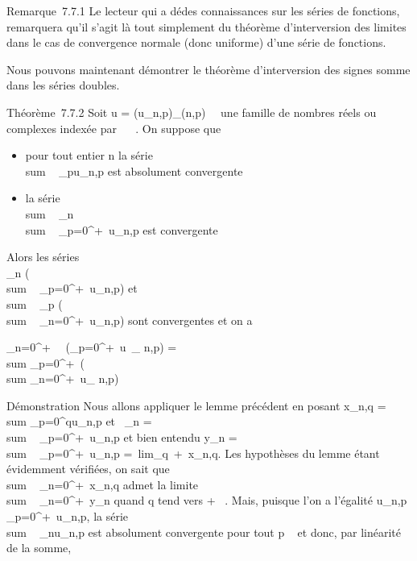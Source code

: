 \documentclass[]{article}
\begin{document}
Remarque~7.7.1 Le lecteur qui a dé des connaissances sur les séries de
fonctions, remarquera qu'il s'agit là tout simplement du théorème
d'interversion des limites dans le cas de convergence normale (donc
uniforme) d'une série de fonctions.

Nous pouvons maintenant démontrer le théorème d'interversion des signes
somme dans les séries doubles.

Théorème~7.7.2 Soit u = (u\_n,p)\_(n,p)\in{}~\times{}~ une famille
de nombres réels ou complexes indexée par ~ \times {}~. On suppose que

\begin{itemize}
\itemsep1pt\parskip0pt
\item
  pour tout entier n la série
  \\sum ~
  \_pu\_n,p est absolument convergente
\item
  la série \\sum ~
  \_n \\sum ~
  \_p=0^+\infty~\textbar{}u\_n,p\textbar{} est
  convergente
\end{itemize}

Alors les séries \\\sum
 \_n\left
(\\sum ~
\_p=0^+\infty~u\_n,p\right ) et
\\sum ~
\_p\left
(\\sum ~
\_n=0^+\infty~u\_n,p\right ) sont
convergentes et on a

\sum \_n=0^+\infty~~\left
(\sum \_p=0^+\infty~u~\_
n,p\right ) = \\sum
\_p=0^+\infty~\left (\\sum
\_n=0^+\infty~u\_ n,p\right )

Démonstration Nous allons appliquer le lemme précédent en posant
x\_n,q =\ \\sum
 \_p=0^qu\_n,p et \alpha~\_n
= \\sum ~
\_p=0^+\infty~\textbar{}u\_n,p\textbar{} et bien entendu
y\_n = \\sum ~
\_p=0^+\infty~u\_n,p =\
lim\_q\rightarrow~+\infty~x\_n,q. Les hypothèses du lemme étant
évidemment vérifiées, on sait que
\\sum ~
\_n=0^+\infty~x\_n,q admet la limite
\\sum ~
\_n=0^+\infty~y\_n quand q tend vers + \infty~. Mais, puisque
l'on a l'égalité
\textbar{}u\_n,p\textbar{}\leq\\\sum
 \_p=0^+\infty~\textbar{}u\_n,p\textbar{}, la série
\\sum ~
\_nu\_n,p est absolument convergente pour tout p \in {}~ et
donc, par linéarité de la somme,
\end{document}
